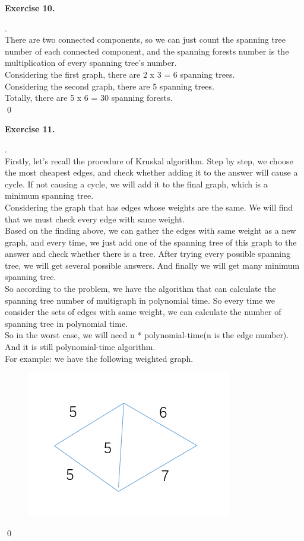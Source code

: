 \documentclass[12pt, notitlepage]{article}
\newenvironment{sol}
  {\par\vspace{3mm}\noindent{\it Solution}.}{\qed}
\begin{document}
\textbf{Exercise 10.}
\begin{sol}\\
There are two connected components, so we can just count the spanning tree number of each connected component, and the spanning forests number is the multiplication of every spanning tree's number.\\
Considering the first graph, there are 2 x 3 = 6 spanning trees.\\
Considering the second graph, there are 5 spanning trees.\\
Totally, there are 5 x 6 = 30 spanning forests.\\
\end{sol}

\textbf{Exercise 11.}
\begin{sol}\\
Firstly, let's recall the procedure of Kruskal algorithm. Step by step, we choose the most cheapest edges, and check whether adding it to the answer will cause a cycle. If not causing a cycle, we will add it to the final graph, which is a minimum spanning tree.\\
Considering the graph that has edges whose weights are the same. We will find that we must check every edge with same weight.\\
Based on the finding above, we can gather the edges with same weight as a new graph, and every time, we just add one of the spanning tree of this graph to the answer and check whether there is a tree. After trying every possible spanning tree, we will get several possible answers. And finally we will get many minimum spanning tree.\\
So according to the problem, we have the algorithm that can calculate the spanning tree number of multigraph in polynomial time. So every time we consider the sets of edges with same weight, we can calculate the number of spanning tree in polynomial time.\\
So in the worst case, we will need n * polynomial-time(n is the edge number). And it is still polynomial-time algorithm.\\
For example: we have the following weighted graph.\\
\begin{figure}[H]
	\center
	\includegraphics[width=0.4\linewidth]{11-1.png}\vspace{-10pt}

\end{figure}
\end{sol}
\end{document}
